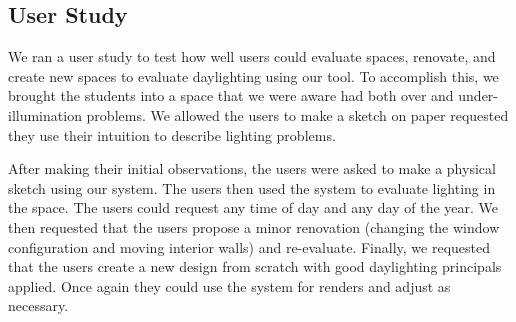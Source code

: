 \documentclass[10pt,twocolumn,letterpaper]{article}
\begin{document}


\subsection{User Study}
We ran a user study to test how well users could evaluate spaces, renovate, and 
create new spaces to evaluate daylighting using our tool. To accomplish this, we brought the students
into a space that we were aware had both over and under-illumination problems.  We 
allowed the users to make a sketch on paper requested they use their intuition to describe lighting problems.

After making their initial observations, the users were asked to make a physical sketch using 
our system.  The users then used the system to evaluate lighting in the space.  The users could request any time of day and any day of the year. 
%
We then requested that the users propose a minor renovation (changing the window configuration and moving interior walls) and re-evaluate.
%
Finally, we requested that the users create a new design from scratch with good daylighting
principals applied.  Once again they could use the system for renders and adjust as necessary.
\end{document}
